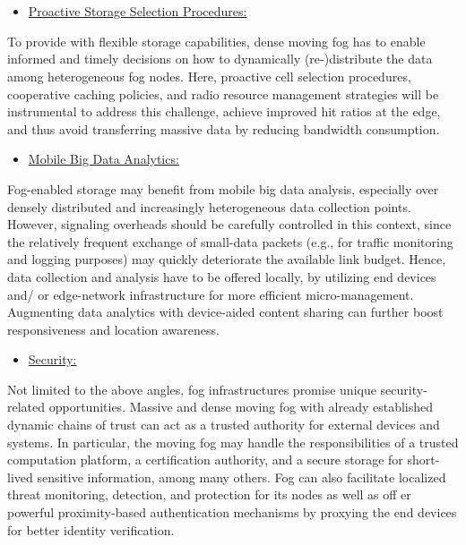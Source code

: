 \documentclass[11pt]{article}
\begin{document}
\newpage

\section*{}

\begin{itemize}
\item {\large \uline{Proactive Storage Selection Procedures:}}
\end{itemize}

To provide with flexible storage capabilities, dense moving fog has to enable informed and timely decisions on how to dynamically (re-)distribute the data among heterogeneous fog nodes. Here, proactive cell selection procedures, cooperative caching policies, and radio resource management strategies will be instrumental to address this challenge, achieve improved hit ratios at the edge, and thus avoid transferring massive data by reducing bandwidth consumption.

\begin{itemize}
\item {\large \uline{Mobile Big Data Analytics:}}
\end{itemize}

Fog-enabled storage may benefit from mobile big data analysis, especially over densely distributed and increasingly heterogeneous data collection points. However, signaling overheads should be carefully controlled in this context, since the relatively frequent exchange of small-data packets (e.g., for traffic monitoring and logging purposes) may quickly deteriorate the available link budget. Hence, data collection and analysis have to be offered locally, by utilizing end devices and/ or edge-network infrastructure for more efficient micro-management. Augmenting data analytics with device-aided content sharing can further boost responsiveness and location awareness.

\begin{itemize}
\item {\large \uline{Security:}}
\end{itemize}

Not limited to the above angles, fog infrastructures promise unique security-related opportunities. Massive and dense moving fog with already established dynamic chains of trust can act as a trusted authority for external devices and systems. In particular, the moving fog may handle the responsibilities of a trusted computation platform, a certification authority, and a secure storage for short-lived sensitive information, among many others. Fog can also facilitate localized threat monitoring, detection, and protection for its nodes as well as off er powerful proximity-based authentication mechanisms by proxying the end devices for better identity verification.
\end{document}
